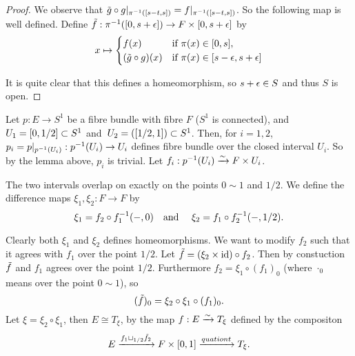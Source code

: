\documentclass[a4paper,11pt,english]{article}
\begin{document}
\begin{exercise}[3]
\begin{enumerate}
\begin{proof}
We observe that $\til g\circ g|_{\pi\i([s-t,s])} = f|_{\pi\i([s-t,s])}$. So
the following map is well defined. Define $\til f: \pi\i([0,s+\eps]) \to F\times
[0,s+\eps]$ by
\[ x \mapsto \pwf{
f(x) &\tif \pi(x) \in [0,s], \\
(\til g \circ g)(x) &\tif \pi(x) \in [s-\eps,s+\eps] } \]

It is quite clear that this defines a homeomorphism, so $s + \eps \in S$ and
thus $S$ is open.

\end{proof}

Let $p : E \to S^1$ be a fibre bundle with fibre $F$ ($S^1$ is connected), and
$U_1 = [0, 1/2] \ss S^1$ and $U_2 = ([1/2,1]) \ss S^1$. Then, for $i=1,2$, 
$p_i = p|_{p\i(U_i)} : p\i(U_i) \to U_i$ defines fibre bundle over the closed
interval $U_i$. So by the lemma above, $p_i$ is trivial. Let $f_i : p\i(U_i)
\congto F \times U_i$.

The two intervals overlap on exactly on the points $0 \sim 1$ and $1/2$. We define
the difference maps $\xi_1, \xi_2: F \to F$ by
\[ \xi_1 = f_2 \circ f_1\i(-,0) \qq\tand
\xi_2 = f_1 \circ f_2\i(-,1/2). \]

Clearly both $\xi_1$ and $\xi_2$ defines homeomorphisms. We want to modify $f_2$
such that it agrees with $f_1$ over the point $1/2$.
Let $\til f = (\xi_2 \times \id) \circ f_2$. Then by constuction $\til f$ and
$f_1$ agrees over the point $1/2$. Furthermore $f_2 = \xi_1 \circ (f_1)_0$
(where $\cdot_0$ means over the point $0\sim 1$), so
\[ (\til f)_0 = \xi_2 \circ \xi_1 \circ (f_1)_0. \]
Let $\xi = \xi_2 \circ \xi_1$, then $E \cong T_\xi$, by the map $f : E \congto
T_\xi$ defined by the compositon
\[ E \xto{ f_1 \sqcup_{1/2} \til f_2 } F \times [0,1]
\xto{quationt} T_\xi. \]
\end{enumerate}
\end{exercise}
\end{document}

